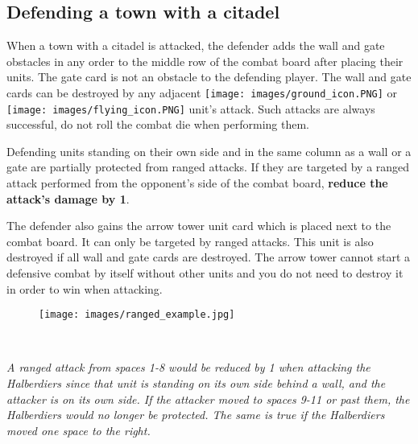 \documentclass[12pt]{article}
\begin{document}
\subsection*{\hypertarget{Walls}{Defending a town with a citadel}}
When a town with a citadel is attacked, the defender adds the wall and gate obstacles in any order to the middle row of the combat board after placing their units. The gate card is not an obstacle to the defending player. The wall and gate cards can be destroyed by any adjacent \texttt{[image: images/ground\_icon.PNG]} or \texttt{[image: images/flying\_icon.PNG]} unit's attack. Such attacks are always successful, do not roll the combat die when performing them.\par
Defending units standing on their own side and in the same column as a wall or a gate are partially protected from ranged attacks. If they are targeted by a ranged attack performed from the opponent's side of the combat board, \textbf{reduce the attack's damage by 1}.
\par
The defender also gains the arrow tower unit card which is placed next to the combat board. It can only be targeted by ranged attacks. This unit is also destroyed if all wall and gate cards are destroyed. The arrow tower cannot start a defensive combat by itself without other units and you do not need to destroy it in order to win when attacking.
\begin{figure}[h]
\centering
\texttt{[image: images/ranged\_example.jpg]}
\end{figure}\\
\begin{center}
\textit{A ranged attack from spaces 1-8 would be reduced by 1 when attacking the Halberdiers since that unit is standing on its own side behind a wall, and the attacker is on its own side. If the attacker moved to spaces 9-11 or past them, the Halberdiers would no longer be protected. The same is true if the Halberdiers moved one space to the right.}
\end{center}

\clearpage
\end{document}
